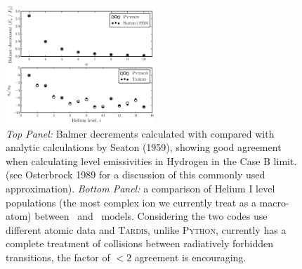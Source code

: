 \documentclass[preprint, a4paper, 11pt]{aastex}
\begin{document}
{\begin{figure}
\centering
\includegraphics[width=0.5\textwidth]{figures/fig_caseb_tardis.eps}
\caption{
{\sl Top Panel:} Balmer decrements calculated with \py compared with analytic calculations
by Seaton (1959), showing good agreement when calculating level emissivities in Hydrogen
in the Case B limit.
(see Osterbrock 1989 for a discussion of this commonly used approximation).
{\sl Bottom Panel:}  a comparison of Helium I level populations (the most complex ion we currently 
treat as a macro-atom) between \py~and \tar~models. Considering the 
two codes use different atomic data and \textsc{Tardis,} unlike \textsc{Python,} currently has 
a complete treatment of collisions between radiatively forbidden transitions, the factor of 
$<2$ agreement is encouraging. 
}
\label{tests}
\end{figure}
\nocite{osterbrock}
\nocite{seaton1959}





%





%
%

}
\end{document}
